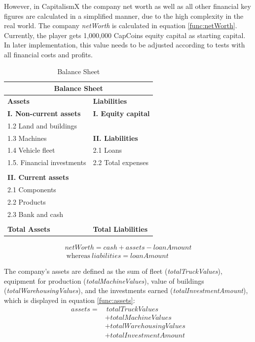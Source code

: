 However, in CapitalismX the company net worth as well as all other financial key figures are calculated in a simplified manner, due to the high complexity in the real world. The company \textit{netWorth} is calculated in equation \ref{func:netWorth}. Currently, the player gets 1,000,000 CapCoins equity capital as starting capital. In later implementation, this value needs to be adjusted according to tests with all financial costs and profits.

\begin{table}[ht]
\begin{tabular}{|p{5.8cm}|p{5.8cm}|}
\hline
\multicolumn{2}{|c|}{\textbf{Balance Sheet}}\\
\hline \textbf{Assets} & \textbf{Liabilities}\\ 
\hline \textbf{I. Non-current assets} & \textbf{I. Equity capital}\\
\hline 1.2 Land and buildings &\\
\hline 1.3 Machines & \textbf{II. Liabilities}\\
\hline 1.4 Vehicle fleet & 2.1 Loans\\
\hline 1.5. Financial investments &  2.2 Total expenses\\
\hline &\\
\hline \textbf{II. Current assets} &\\
\hline 2.1 Components &\\
\hline 2.2 Products &\\
\hline 2.3 Bank and cash &\\
\hline &\\
\hline \textbf{Total Assets} & \textbf{Total Liabilities}\\
\hline
\end{tabular}
\caption{Balance Sheet}
\label{tab:balanceSheet}
\end{table}

\begin{equation}
\label{func:netWorth}
\begin{split}
    netWorth = cash + assets - loanAmount \\ ~\text{whereas}~liabilities = loanAmount
    \end{split}
\end{equation}

The company's assets are defined as the sum of fleet (\textit{totalTruckValues}), equipment for production (\textit{totalMachineValues}), value of buildings (\textit{totalWarehousingValues}), and the investments earned (\textit{totalInvestmentAmount}), which is displayed in equation \ref{func:assets}:
\begin{equation}
    \label{func:assets}
    \begin{aligned}
        assets = & ~totalTruckValues \\
        &+ totalMachineValues \\ 
        &+ totalWarehousingValues \\
        &+ totalInvestmentAmount
    \end{aligned}
\end{equation}

